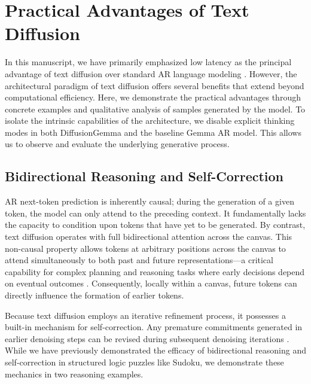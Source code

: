 \documentclass[11pt, a4paper, logo, copyright, gdm]{google}
\begin{document}
\section{Practical Advantages of Text Diffusion}\label{sec:advantages}

In this manuscript, we have primarily emphasized low latency as the principal advantage of text diffusion over standard AR language modeling \citep{ghazvininejad2019mask, gong2022diffuseq, li2022diffusionlm, dieleman2022continuous}. However, the architectural paradigm of text diffusion offers several benefits that extend beyond computational efficiency. Here, we demonstrate the practical advantages through concrete examples and qualitative analysis of samples generated by the model. To isolate the intrinsic capabilities of the architecture, we disable explicit thinking modes in both DiffusionGemma and the baseline Gemma AR model. This allows us to observe and evaluate the underlying generative process.


\subsection{Bidirectional Reasoning and Self-Correction}
AR next-token prediction is inherently causal; during the generation of a given token, the model can only attend to the preceding context. It fundamentally lacks the capacity to condition upon tokens that have yet to be generated. By contrast, text diffusion operates with full bidirectional attention across the canvas. This non-causal property allows tokens at arbitrary positions across the canvas to attend simultaneously to both past and future representations---a critical capability for complex planning and reasoning tasks where early decisions depend on eventual outcomes \citep[e.g.,][]{papadopoulos2024arrows, kitouni2024factorization, zhangli2024reverse, nagarajan2025roll}. Consequently, locally within a canvas, future tokens can directly influence the formation of earlier tokens.

Because text diffusion employs an iterative refinement process, it possesses a built-in mechanism for self-correction. Any premature commitments generated in earlier denoising steps can be revised during subsequent denoising iterations \citep{reid2022diffuser, han2023ssdlm}. While we have previously demonstrated the efficacy of bidirectional reasoning and self-correction in structured logic puzzles like Sudoku, we demonstrate these mechanics in two reasoning examples.
\end{document}
